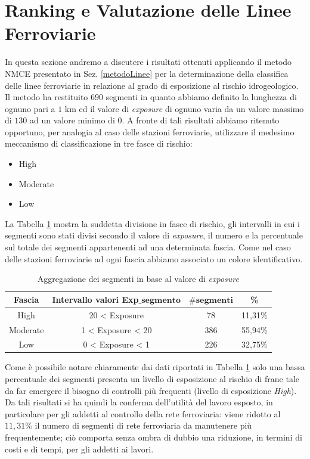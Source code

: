 \section{Ranking e Valutazione delle Linee Ferroviarie}
\label{ranking:linee}
In questa sezione andremo a discutere i risultati ottenuti applicando il metodo NMCE presentato in Sez. \ref{metodoLinee} per la determinazione della classifica delle linee ferroviarie in relazione al grado di esposizione al rischio idrogeologico.\newline \newline
Il metodo ha restituito $690$ segmenti in quanto abbiamo definito la lunghezza di ognuno pari a $1$ km ed il valore di \textit{exposure} di ognuno varia da un valore massimo di $130$ ad un valore minimo di $0$. A fronte di tali risultati abbiamo ritenuto opportuno, per analogia al caso delle stazioni ferroviarie, utilizzare il medesimo meccanismo di classificazione in tre fasce di rischio:
\begin{itemize}
	\item High
	\item Moderate
	\item Low
\end{itemize}
La Tabella \ref{rangeLinee} mostra la suddetta divisione in fasce di rischio, gli intervalli in cui i segmenti sono stati divisi secondo il valore di \textit{exposure}, il numero e la percentuale sul totale dei segmenti appartenenti ad una determinata fascia. Come nel caso delle stazioni ferroviarie ad ogni fascia abbiamo associato un colore identificativo.
\begin{table}[h]
\centering
\begin{tabular}{|c|c|c|c|}
\hline
\rowcolor{lightgray}
\textbf{Fascia} & \textbf{Intervallo valori Exp$\mathbf{\_}$$\mathbf{segmento}$} & $\mathbf{\#segmenti}$ & \textbf{\%} \\
\hline
\rowcolor{flamingopink}
High & 20 < Exposure  & 78 & 11,31\%\\
\hline
\rowcolor{icterine}
Moderate & 1 < Exposure < 20 & 386 & 55,94\%\\
\hline
\rowcolor{inchworm}
Low & $0$ < Exposure < 1 & 226 & 32,75\%\\
\hline
\end{tabular}
\caption{Aggregazione dei segmenti in base al valore di \textit{exposure} }
\label{rangeLinee}
\end{table}
\newline
Come è possibile notare chiaramente dai dati riportati in Tabella \ref{rangeLinee} solo una bassa percentuale dei segmenti presenta un livello di esposizione al rischio di frane tale da far emergere il bisogno di controlli più frequenti (livello di esposizione \textit{High}). Da tali risultati si ha quindi la conferma dell'utilità del lavoro esposto, in particolare per gli addetti al controllo della rete ferroviaria: viene ridotto al $11,31\%$ il numero di segmenti di rete ferroviaria da manutenere più frequentemente; ciò comporta senza ombra di dubbio una riduzione, in termini di costi e di tempi, per gli addetti ai lavori.\newline
